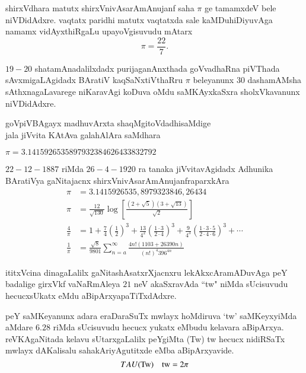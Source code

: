 shirxVdhara matutx shirxVnivAsarAmAnujanf saha $\pi$ ge tamamxdeV bele niVDidAdxre. vaqtatx paridhi matutx vaqtatxda sale kaMDuhiDiyuvAga namamx vidAyxthiRgaLu upayoVgisuvudu mAtarx
$$
\pi = \frac{22}{7}.
$$

$19-20$ shatamAnadalilxdadx purijaganAnxthada goVvadhaRna piVThada sAvxmigaLAgidadx BAratiV kaqSaNxtiVthaRru $\pi$ beleyanunx $30$ dashamAMsha sAthxnagaLavarege niKaravAgi koDuva oMdu saMKAyxkaSxra sholxVkavanunx niVDidAdxre. 
\begin{center}
goVpiVBAgayx madhuvArxta shaqMgitoVdadhisaMdige\\
jala jiVvita KAtAva galahAlAra saMdhara
\end{center}

$\pi = 3.1415926535897932384626433832792$

\vfill\eject
$22-12-1887$ riMda $26-4-1920$ ra tanaka jiVvitavAgidadx Adhunika BAratiVya gaNitajacnx shirxVnivAsarAmAnujanfraparxkAra
\begin{align*}
\pi &= 3.1415926535,8979323846,26434\\
\pi &= \frac{12}{\sqrt{130}}\log\left[\frac{{(2+\sqrt{5})}{(3+\sqrt{13})}}{\sqrt{2}}\right]\\
\frac{4}{\pi} &= 1 + \frac{7}{4}\left(\frac{1}{2}\right)^3 + \frac{13}{4^{2}}\left(\frac{1 \cdot 3}{2 \cdot 4}\right)^3 + \frac{9}{4^{3}}\left(\frac{1 \cdot 3 \cdot 5}{2 \cdot 4 \cdot 6}\right)^3 +\cdots\\
\frac{1}{\pi} &= \frac{\sqrt{8}}{9801} \sum_{n=a}^\infty \frac{4n!(1103+26390n)}{(n!)^{4}396^{4n}}
\end{align*}

ititxVcina dinagaLalilx gaNitashAsatxrXjacnxru lekAkxcAramADuvAga peY badalige girxVkf  vaNaRmAleya $21$ neV akaSxravAda ``tw" niMda sUcisuvudu hecucxsUkatx eMdu aBipArxyapaTiTxdAdxre.

peY saMKeyanunx adara eraDaraSuTx mwlayx hoMdiruva `tw' saMKeyxyiMda aMdare $6.28$ riMda sUcisuvudu hecucx yukatx eMbudu kelavara aBipArxya. reVKAgaNitada kelavu sUtarxgaLalilx peYgiMta (Tw) tw hecucx nidiRSaTx mwlayx dAKalisalu sahakAriyAgutitxde eMba aBipArxyavide.
$$
TAU\text{(Tw)\quad tw} = 2\pi
$$
